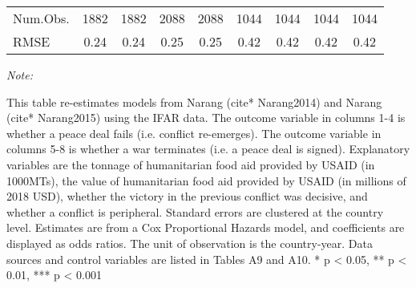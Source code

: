 \begin{table}
\begin{threeparttable}
\begin{tabular}[t]{lcccccccc}
Num.Obs. & \num{1882} & \num{1882} & \num{2088} & \num{2088} & \num{1044} & \num{1044} & \num{1044} & \num{1044}\\
RMSE & \num{0.24} & \num{0.24} & \num{0.25} & \num{0.25} & \num{0.42} & \num{0.42} & \num{0.42} & \num{0.42}\\
\bottomrule
\end{tabular}
\begin{tablenotes}[para]
\item \textit{Note: } 
\item This table re-estimates models from Narang (cite*{ Narang2014}) and Narang (cite*{ Narang2015}) using the IFAR data. The outcome variable in columns 1-4 is whether a peace deal fails (i.e. conflict re-emerges). The outcome variable in columns 5-8 is whether a war terminates (i.e. a peace deal is signed). Explanatory variables are the tonnage of humanitarian food aid provided by USAID (in 1000MTs), the value of humanitarian food aid provided by USAID (in millions of 2018 USD), whether the victory in the previous conflict was decisive, and whether a conflict is peripheral. Standard errors are clustered at the country level. Estimates are from a Cox Proportional Hazards model, and coefficients are displayed as odds ratios. The unit of observation is the country-year. Data sources and control variables are listed in Tables A9 and A10. * p < 0.05, ** p < 0.01, *** p < 0.001
\end{tablenotes}
\end{threeparttable}
\end{table}
